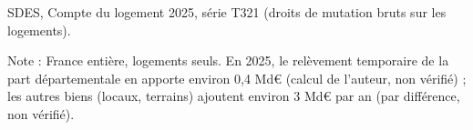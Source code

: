SDES, Compte du logement 2025, série T321 (droits de mutation bruts sur les logements).\par Note : France entière, logements seuls. En 2025, le relèvement temporaire de la part départementale en apporte environ 0,4 Md\euro{} (calcul de l'auteur, non vérifié) ; les autres biens (locaux, terrains) ajoutent environ 3 Md\euro{} par an (par différence, non vérifié).
